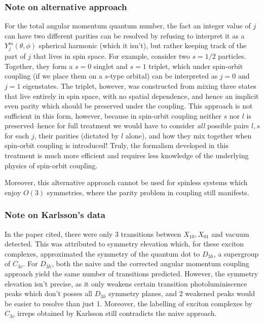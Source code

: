 \documentclass[12pt]{article}
\begin{document}
	\subsubsection{Note on alternative approach}
	For the total angular momentum quantum number, the fact an integer value of $j$ can have two different parities can be resolved by refusing to interpret it as a $Y_j^m(\theta, \phi)$ spherical harmonic (which it isn't), but rather keeping track of the part of $j$ that lives in spin space. For example, consider two $s=1/2$ particles. Together, they form a $s=0$ singlet and $s=1$ triplet, which under spin-orbit coupling (if we place them on a $s$-type orbital) can be interpreted as $j=0$ and $j=1$ eigenstates. The triplet, however, was constructed from mixing three states that live entirely in spin space, with no spatial dependence, and hence an implicit even parity which should be preserved under the coupling. This approach is not sufficient in this form, however, because in spin-orbit coupling neither $s$ nor $l$ is preserved--hence for full treatment we would have to consider \textit{all} possible pairs $l,s$ for each $j$, their parities (dictated by $l$ alone), and how they mix together when spin-orbit coupling is introduced! Truly, the formalism developed in this treatment is much more efficient and requires less knowledge of the underlying physics of spin-orbit coupling.
	
	Moreover, this alternative approach cannot be used for spinless systems which enjoy $O(3)$ symmetries, where the parity problem in coupling still manifests.
	
	\subsubsection{Note on Karlsson's data}
	
	In the paper cited, there were only 3 transitions between $X_{10},X_{01}$ and vacuum detected. This was attributed to symmetry elevation which, for these exciton complexes, approximated the symmetry of the quantum dot to $D_{3h}$, a supergroup of $C_{3v}$. For $D_{3h}$, both the naive and the corrected angular momentum coupling approach yield the same number of transitions predicted. However, the symmetry elevation isn't precise, as it only weakens certain transition photoluminiscence peaks which don't posses all $D_{3h}$ symmetry planes, and 2 weakened peaks would be easier to resolve than just 1. Moreover, the labelling of exciton complexes by $C_{3v}$ irreps obtained by Karlsson still contradicts the naive approach.
	
\end{document}
